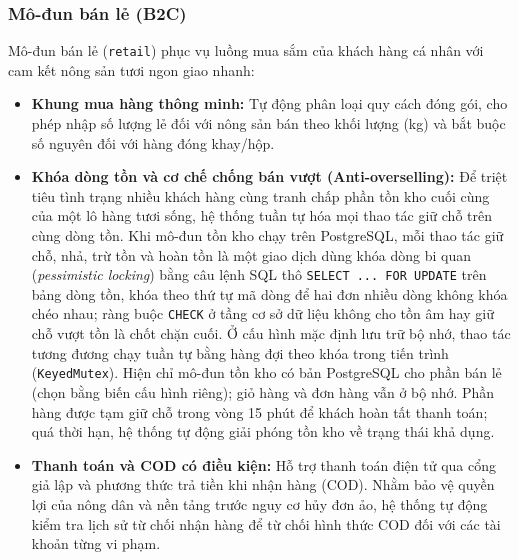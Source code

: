 \subsubsection*{Mô-đun bán lẻ (B2C)}
Mô-đun bán lẻ (\texttt{retail}) phục vụ luồng mua sắm của khách hàng cá nhân với cam kết nông sản tươi ngon giao nhanh:
\begin{itemize}
    \item \textbf{Khung mua hàng thông minh:} Tự động phân loại quy cách đóng gói, cho phép nhập số lượng lẻ đối với nông sản bán theo khối lượng (kg) và bắt buộc số nguyên đối với hàng đóng khay/hộp.
    \item \textbf{Khóa dòng tồn và cơ chế chống bán vượt (Anti-overselling):} Để triệt tiêu tình trạng nhiều khách hàng cùng tranh chấp phần tồn kho cuối cùng của một lô hàng tươi sống, hệ thống tuần tự hóa mọi thao tác giữ chỗ trên cùng dòng tồn. Khi mô-đun tồn kho chạy trên PostgreSQL, mỗi thao tác giữ chỗ, nhả, trừ tồn và hoàn tồn là một giao dịch dùng khóa dòng bi quan (\emph{pessimistic locking}) bằng câu lệnh SQL thô \texttt{SELECT ... FOR UPDATE} trên bảng dòng tồn, khóa theo thứ tự mã dòng để hai đơn nhiều dòng không khóa chéo nhau; ràng buộc \texttt{CHECK} ở tầng cơ sở dữ liệu không cho tồn âm hay giữ chỗ vượt tồn là chốt chặn cuối. Ở cấu hình mặc định lưu trữ bộ nhớ, thao tác tương đương chạy tuần tự bằng hàng đợi theo khóa trong tiến trình (\texttt{KeyedMutex}). Hiện chỉ mô-đun tồn kho có bản PostgreSQL cho phần bán lẻ (chọn bằng biến cấu hình riêng); giỏ hàng và đơn hàng vẫn ở bộ nhớ. Phần hàng được tạm giữ chỗ trong vòng 15 phút để khách hoàn tất thanh toán; quá thời hạn, hệ thống tự động giải phóng tồn kho về trạng thái khả dụng.
    \item \textbf{Thanh toán và COD có điều kiện:} Hỗ trợ thanh toán điện tử qua cổng giả lập và phương thức trả tiền khi nhận hàng (COD). Nhằm bảo vệ quyền lợi của nông dân và nền tảng trước nguy cơ hủy đơn ảo, hệ thống tự động kiểm tra lịch sử từ chối nhận hàng để từ chối hình thức COD đối với các tài khoản từng vi phạm.
\end{itemize}

